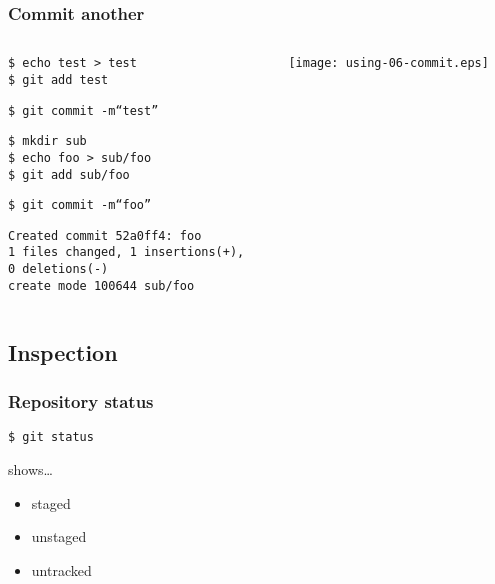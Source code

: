 \documentclass[english]{beamer}
\newcommand{\mysubsection}[2]{%
  \hypertarget{#2}{}%
  \subsection{#1}%
  \label{#2}%
}
\newcommand{\CMD}[1]{%
\texttt{\textcolor{code-green}{#1}}%
}
\newcommand{\cmd}[1]{%
\texttt{\textcolor{code-orange}{#1}}%
}
\newcommand{\fnt}[1]{%
\texttt{\textcolor{code-gray}{#1}}%
}
\begin{document}
\begin{frame}
\frametitle{Commit another}
\begin{columns}[t]
        \begin{column}[T]{.5\textwidth}
                \cmd{\$ echo test > test} \\
                \CMD{\$ git add test}

                \vspace{.1\textheight}

                \CMD{\$ git commit -m``test''} \\

                \vspace{.1\textheight}

                \cmd{\$ mkdir sub} \\
                \cmd{\$ echo foo > sub/foo} \\
                \CMD{\$ git add sub/foo}

                \vspace{.1\textheight}

                \CMD{\$ git commit -m``foo''} \\
                {\tiny
                \fnt{Created commit 52a0ff4: foo \\
                       1 files changed, 1 insertions(+), \\ 0 deletions(-) \\
                       create mode 100644 sub/foo}
                }
        \end{column}
        \begin{column}[T]{.5\textwidth}

                \texttt{[image: using-06-commit.eps]}

        \end{column}
\end{columns}
\end{frame}

\mysubsection{Inspection}{using:inspection}
\begin{frame}
\frametitle{Repository status}

\CMD{\$ git status}

\vspace{.1\textheight}
shows\ldots
\begin{itemize}
        \item staged
        \item unstaged
        \item untracked
\end{itemize}
\end{frame}
\end{document}
